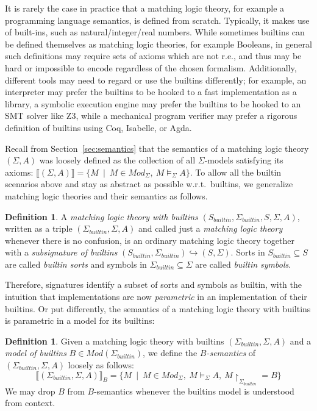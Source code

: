 \documentclass[UTF8,11pt]{article}
\newcounter{thmcounter}
\theoremstyle{plain}
\theoremstyle{definition}
\newtheorem{definition} [thmcounter]{Definition}
\theoremstyle{remark}
\newcommand{\Mod}{\textit{Mod}}
\newcommand{\denote}[1]{\llbracket{#1}\rrbracket}
\newcommand{\reduct}[2]{\mbox{${#1}\!\!\upharpoonright_{#2}$}}
\newcommand{\builtin}{\textit{builtin}}
\begin{document}
It is rarely the case in practice that a matching logic theory, for example
a programming language semantics, is defined from scratch.
Typically, it makes use of built-ins, such as natural/integer/real numbers.
While sometimes builtins can be defined themselves as matching logic theories,
for example Booleans, in general such definitions may require sets of axioms
which are not r.e., and thus may be hard or impossible to encode regardless
of the chosen formalism.
Additionally, different tools may need to regard or use the builtins
differently;
for example, an interpreter may prefer the builtins to be hooked to a
fast implementation as a library, a symbolic execution engine may prefer the
builtins to be hooked to an SMT solver like Z3, while a mechanical program
verifier may prefer a rigorous definition of builtins using Coq, Isabelle,
or Agda.

Recall from Section~\ref{sec:semantics} that the semantics of a matching
logic theory $(\Sigma,A)$ was loosely defined as the collection of all
$\Sigma$-models satisfying its axioms: $\denote{(\Sigma,A)} =
\{M \ \mid \ M \in \Mod_{\Sigma},\ M \models_{\Sigma} A \}$.
To allow all the builtin scenarios above and stay as abstract as possible
w.r.t.~builtins, we generalize matching logic theories and their semantics
as follows.

\begin{definition}
A \emph{matching logic theory with builtins}
$(S_\builtin,\Sigma_\builtin,S,\Sigma,A)$, written as a triple
$(\Sigma_\builtin,\Sigma,A)$ and
called just a \emph{matching logic theory} whenever there is no confusion,
is an ordinary matching logic theory together with a
\emph{subsignature of builtins}
$(S_\builtin,\Sigma_\builtin)\hookrightarrow(S,\Sigma)$.
Sorts in $S_\builtin \subseteq S$ are called \emph{builtin sorts} and symbols in
$\Sigma_\builtin \subseteq \Sigma$ are called \emph{builtin symbols}.
\end{definition}

Therefore, signatures identify a subset of sorts and symbols as builtin,
with the intuition that implementations are now \emph{parametric} in an
implementation of their builtins.
Or put differently, the semantics of a matching logic theory with builtins
is parametric in a model for its builtins:

\begin{definition}
Given a matching logic theory with builtins $(\Sigma_\builtin,\Sigma,A)$ and
a \emph{model of builtins} $B \in \Mod(\Sigma_\builtin)$, we define
the \emph{$B$-semantics} of $(\Sigma_\builtin,\Sigma,A)$ loosely as follows:
$$
\denote{(\Sigma_\builtin,\Sigma,A)}_B = 
\{M \ \mid \ M \in \Mod_{\Sigma},\ M \models_{\Sigma} A,\ \reduct{M}{\Sigma_\builtin} = B \}
$$
We may drop $B$ from $B$-semantics whenever the builtins model is
understood from context.
\end{definition}
\end{document}
